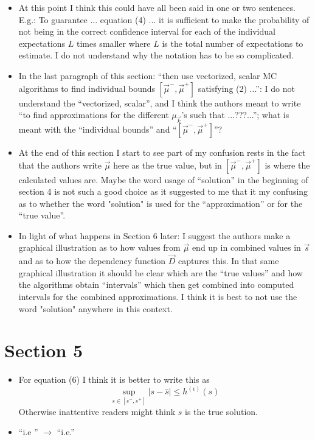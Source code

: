 \documentclass{article}[12pt]
\newcommand{\Referee}[1]{{\color{blue} #1}}
\begin{document}
\begin{itemize}
    \item \Referee{At this point I think this could have all been said in one or two sentences. E.g.: To guarantee ... equation (4) ... it is sufficient to make the probability of not being in the correct confidence interval for each of the individual expectations $L$ times smaller where $L$ is the total number of expectations to estimate. I do not understand why the notation has to be so complicated.}
    \item \Referee{In the last paragraph of this section: ``then use vectorized, scalar MC algorithms to find individual bounds $[\vec{\mu}^-, \vec{\mu}^+]$ satisfying (2) ...'': I do not understand the ``vectorized, scalar'', and I think the authors meant to write ``to find approximations for the different $\mu_{\vec{k}}$'s such that ...???...''; what is meant with the ``individual bounds'' and ``$[\vec{\mu}^-, \vec{\mu}^+]$''?}
    \item \Referee{At the end of this section I start to see part of my confusion rests in the fact that the authors write $\vec{\mu}$ here as the true value, but in $[\vec{\mu}^-, \vec{\mu}^+]$ is where the calculated values are. Maybe the word usage of ``solution'' in the beginning of section 4 is not such a good choice as it suggested to me that it my confusing as to whether the word "solution" is used for the ``approximation'' or for the ``true value''.} 
    \item \Referee{In light of what happens in Section 6 later: I suggest the authors make a graphical illustration as to how values from $\vec{\mu}$ end up in combined values in $\vec{s}$ and as to how the dependency function $\vec{D}$ captures this. In that same graphical illustration it should be clear which are the ``true values'' and how the algorithms obtain ``intervals'' which then get combined into computed intervals for the combined approximations. I think it is best to not use the word "solution" anywhere in this context.}
\end{itemize}

\section{Section 5}

\begin{itemize}
    \item \Referee{For equation (6) I think it is better to write this as
    $$\sup_{s \in [s^-, s^+]} |s - \hat{s}| \le h^{(\epsilon)}(s)$$
  Otherwise inattentive readers might think $s$ is the true solution.}
  \item \Referee{``i.e '' $\to$ ``i.e.''}
\end{itemize}
\end{document}

